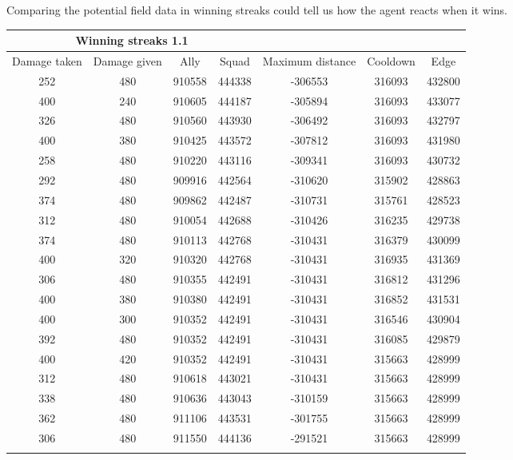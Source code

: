 Comparing the potential field data in winning streaks could tell us how the agent reacts when it wins.
\newpage
\begin{centering}
 \begin{tabular}{|c||c|c|c|c|c|c|}
	\multicolumn{4}{c}{Winning streaks 1.1} \\
	\hline
		Damage taken & Damage given & Ally & Squad & Maximum distance & Cooldown & Edge \\
	\hline
	
	252&	480&	910558&	444338&	-306553&	316093&	432800\\
	400&	240&	910605&	444187&	-305894&	316093&	433077\\
	326&	480&	910560&	443930&	-306492&	316093&	432797\\
	400&	380&	910425&	443572&	-307812&	316093&	431980\\
	258&	480&	910220&	443116&	-309341&	316093&	430732\\
	292&	480&	909916&	442564&	-310620&	315902&	428863\\
	374&	480&	909862&	442487&	-310731&	315761&	428523\\
	312&	480&	910054&	442688&	-310426&	316235&	429738\\
	374&	480&	910113&	442768&	-310431&	316379&	430099\\
	400&	320&	910320&	442768&	-310431&	316935&	431369\\
	306&	480&	910355&	442491&	-310431&	316812&	431296\\
	400&	380&	910380&	442491&	-310431&	316852&	431531\\
	400&	300&	910352&	442491&	-310431&	316546&	430904\\
	392&	480&	910352&	442491&	-310431&	316085&	429879\\
	400&	420&	910352&	442491&	-310431&	315663&	428999\\
	312&	480&	910618&	443021&	-310431&	315663&	428999\\
	338&	480&	910636&	443043&	-310159&	315663&	428999\\
	362&	480&	911106&	443531&	-301755&	315663&	428999\\
	306&	480&	911550&	444136&	-291521&	315663&	428999\\
	
	
	
	
	\hline
\label{test1.1}
\end{tabular}
\end{centering}




